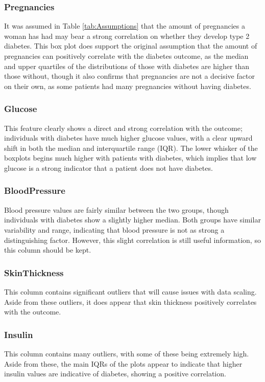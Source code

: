 \pagebreak

\subsubsection{Pregnancies}
It was assumed in Table \ref{tab:Assumptions} that the amount of pregnancies a woman has had may bear a strong correlation
on whether they develop type 2 diabetes. This box plot does support the original assumption that the amount of pregnancies can positively 
correlate with the diabetes outcome, as the median and upper quartiles of the distributions of those with 
diabetes are higher than those without, though it also confirms that pregnancies are not a decisive factor 
on their own, as some patients had many pregnancies without having diabetes.

\subsubsection{Glucose}
This feature clearly shows a direct and strong correlation with the outcome; individuals with diabetes have
much higher glucose values, with a clear upward shift in both the median and interquartile range (IQR).
The lower whisker of the boxplots begins much higher with patients with diabetes, which implies that low glucose is a strong 
indicator that a patient does not have diabetes.

\subsubsection{BloodPressure}
Blood pressure values are fairly similar between the two groups, though individuals with diabetes show a slightly higher median.
Both groups have similar variability and range, indicating that blood pressure is not as strong a distinguishing factor. 
However, this slight correlation is still useful information, so this column should be kept. 

\subsubsection{SkinThickness}
This column contains significant outliers that will cause issues with data scaling.
Aside from these outliers, it does appear that skin thickness positively correlates with the outcome.

\subsubsection{Insulin}
This column contains many outliers, with some of these being extremely high. Aside from these, 
the main IQRs of the plots appear to indicate that higher insulin values are indicative of diabetes,
showing a positive correlation.

